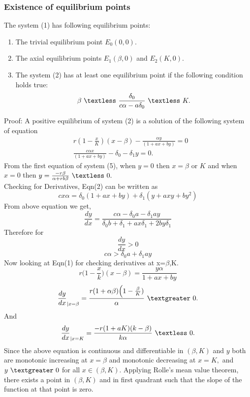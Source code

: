 \documentclass[a4paper, 10pt]{article}
\begin{document}
	\subsubsection{Existence of equilibrium points}
	The system (1) has following equilibrium points:
	\begin{enumerate}
		\item The trivial equilibrium point $E_0(0,0).$
		\item The axial equilibrium points $E_1(\beta,0)$ and $E_2(K,0).$
		\item  The system (2) has at least one equilibrium point if the following condition holds true:
		\begin{equation}
		\beta~ \textless ~\frac{\delta_0}{c\alpha-a\delta_0}~ \textless~ K.
		\end{equation}
	\end{enumerate} 
	Proof: A positive equilibrium of system (2) is a solution of the following system of equation
	\begin{equation}
	\begin{split}
	&r(1-\frac{x}{K})(x-\beta)-\frac{\alpha y}{(1+ax+by)}=0\\
	&\frac{c\alpha x}{(1+ax+by)}-\delta_0-\delta_1 y=0.
	\end{split}
	\end{equation}
	From the first equation of system (5), when $y=0$ then $x=\beta$ or $K$ and when $x=0$ then $y=\frac{-r\beta}{\alpha+rb\beta} ~ \textless~ 0.$\\
	Checking for Derivatives,
	Eqn(2) can be written as 
	\[cx\alpha=\delta_0(1+ax+by)+\delta_1(y+axy+by^2)\]
	From above equation we get,
	\[\frac{dy}{dx}=\frac{c\alpha-\delta_0a-\delta_1ay}{\delta_0b+\delta_1+ax\delta_1+2by\delta_1}\]
	Therefore for \[\frac{dy}{dx}>0\]
	\[c\alpha>\delta_0a+\delta_1ay\]
	Now looking at Eqn(1) for checking derivatives at x=$\beta$,K.
	\[r\Big(1-\frac{x}{k})(x-\beta)=\frac{y\alpha}{1+ax+by}\] 
	\[\frac{dy}{dx}_{\lvert
	x=\beta}=\frac{r(1+\alpha\beta)\Big(1-\frac{\beta}{K})}{\alpha}
    ~ \textgreater~ 0.\]
    And
    \[\frac{dy}{dx}_{\lvert
    	x=K}=\frac{-r(1+aK)(k-\beta)}{k\alpha}
    ~ \textless~ 0.\]
	 Since the above equation is continuous and differentiable in $(\beta,K)$ and $y$ both are monotonic increasing at $x=\beta$ and monotonic decreasing at $x=K,$ and $y~\textgreater~0$ for all $x\in (\beta,K).$ Applying Rolle's  mean value theorem, there exists a point in $(\beta,K)$ and in first quadrant such that the slope of the function at that point is zero.\\
	 
\end{document}
